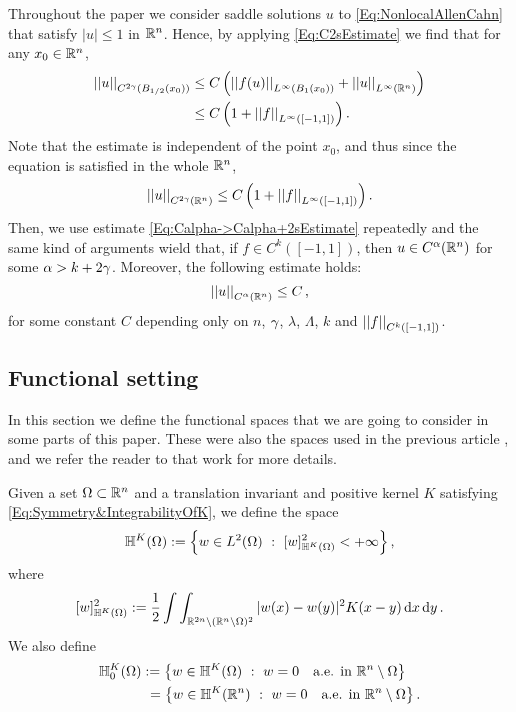Throughout the paper we consider saddle solutions $u$ to \eqref{Eq:NonlocalAllenCahn} that satisfy $|u|\leq 1$ in $\mathbb{R}^n$. Hence, by applying \eqref{Eq:C2sEstimate} we find that for any $x_0\in \mathbb{R}^n$,
\begin{align*}
\left | \left |{u} \right | \right |_{C^{2\gamma} (B_{1/2} (x_0))} &\leq C\left ( {\left | \left |{f(u)} \right | \right |_{L^\infty (B_1(x_0))} + \left | \left |{u} \right | \right |_{L^\infty  (\mathbb{R}^n)} }\right ) \\
&\leq C\left ( {1 + \left | \left |{f} \right | \right |_{L^\infty ([-1,1])} }\right ).
\end{align*}
Note that the estimate is independent of the point $x_0$, and thus since the equation is satisfied in the whole $\mathbb{R}^n$,
$$
\left | \left |{u} \right | \right |_{C^{2\gamma}(\mathbb{R}^n)} \leq C\left ( {1 + \left | \left |{f} \right | \right |_{L^\infty ([-1,1])} }\right ).
$$
Then, we use estimate \eqref{Eq:Calpha->Calpha+2sEstimate} repeatedly and the same kind of arguments wield that, if $f\in C^{k}([-1,1])$, then $u\in C^{\alpha}(\mathbb{R}^n)$ for some $\alpha > k+ 2 \gamma$. Moreover, the following estimate holds:
$$
\left | \left |{u} \right | \right |_{C^{\alpha}(\mathbb{R}^n)} \leq C\,,
$$
for some constant $C$ depending only on $n$, $\gamma$, $\lambda$, $\Lambda$, $k$ and $\left | \left |{f} \right | \right |_{C^k([-1,1])}$.


\subsection{Functional setting}
\label{Subsec:Functional setting}



In this section we define the functional spaces that we are going to consider in some parts of this paper. These were also the spaces used in the previous article \cite{FelipeSanz-Perela:IntegroDifferentialI}, and we refer the reader to that work for more details.

Given a set $\Omega \subset \mathbb{R}^n$ and a translation invariant and positive kernel $K$ satisfying \eqref{Eq:Symmetry&IntegrabilityOfK}, we define the space
$$
\mathbb{H}^K(\Omega) := \left \{ w \in L^2(\Omega) \ : \ [w]^2_{\mathbb{H}^K(\Omega)} < + \infty \right \},
$$
where
$$
[w]^2_{\mathbb{H}^K(\Omega)} := \dfrac{1}{2}\int\int_{\mathbb{R}^{2n} \setminus (\mathbb{R}^n\setminus\Omega)^2} |w(x) - w(y)|^2 K(x-y) \,\mathrm{d} x \,\mathrm{d} y\,.
$$
We also define
\begin{align*}
\mathbb{H}^K_0(\Omega) &:= \left \{ w \in \mathbb{H}^K(\Omega) \ : \  w = 0 \quad \textrm{a.e. in } \mathbb{R}^n \setminus \Omega \right \} \\
&\ = \left \{ w \in \mathbb{H}^K(\mathbb{R}^n) \ : \  w = 0 \quad \textrm{a.e. in } \mathbb{R}^n \setminus \Omega \right \}.
\end{align*}

